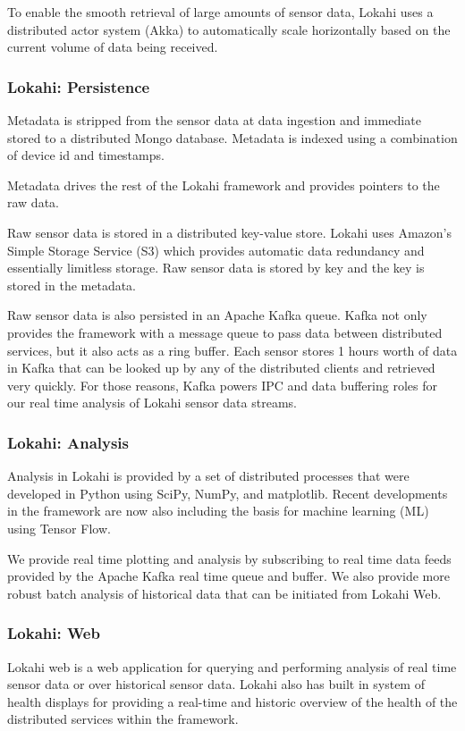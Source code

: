 To enable the smooth retrieval of large amounts of sensor data, Lokahi uses a distributed actor system (Akka) to automatically scale horizontally based on the current volume of data being received. 

\subsubsection{Lokahi: Persistence}
Metadata is stripped from the sensor data at data ingestion and immediate stored to a distributed Mongo database. Metadata is indexed using a combination of device id and timestamps. 

Metadata drives the rest of the Lokahi framework and provides pointers to the raw data.

Raw sensor data is stored in a distributed key-value store. Lokahi uses Amazon's Simple Storage Service (S3) which provides automatic data redundancy and essentially limitless storage. Raw sensor data is stored by key and the key is stored in the metadata.

Raw sensor data is also persisted in an Apache Kafka queue. Kafka not only provides the framework with a message queue to pass data between distributed services, but it also acts as a ring buffer. Each sensor stores 1 hours worth of data in Kafka that can be looked up by any of the distributed clients and retrieved very quickly. For those reasons, Kafka powers IPC and data buffering roles for our real time analysis of Lokahi sensor data streams.  

\subsubsection{Lokahi: Analysis}
Analysis in Lokahi is provided by a set of distributed processes that were developed in Python using SciPy, NumPy, and matplotlib. Recent developments in the framework are now also including the basis for machine learning (ML) using Tensor Flow.

We provide real time plotting and analysis by subscribing to real time data feeds provided by the Apache Kafka real time queue and buffer. We also provide more robust batch analysis of historical data that can be initiated from Lokahi Web.


\subsubsection{Lokahi: Web}
Lokahi web is a web application for querying and performing analysis of real time sensor data or over historical sensor data. Lokahi also has built in system of health displays for providing a real-time and historic overview of the health of the distributed services within the framework. 

